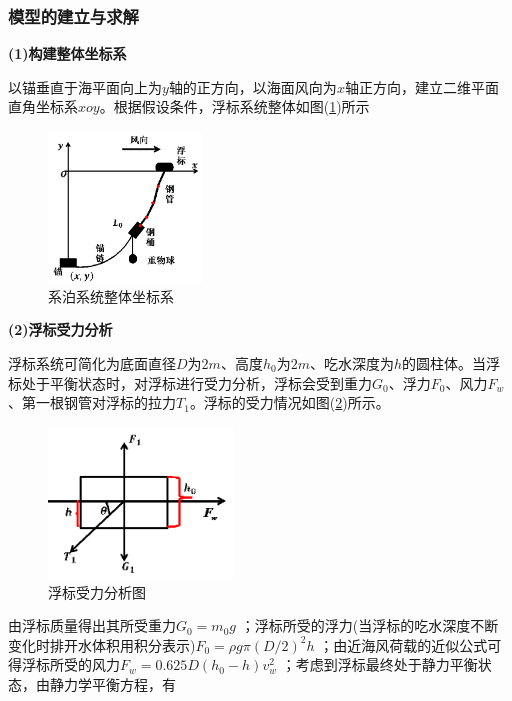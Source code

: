         \subsubsection{模型的建立与求解}
            \par
            \textbf{(1)构建整体坐标系}
            \par
            以锚垂直于海平面向上为$y$轴的正方向，以海面风向为$x$轴正方向，建立二维平面直角坐标系$xoy$。根据假设条件，浮标系统整体如图(\ref{fig:系泊系统整体坐标系})所示
            \begin{figure}[H]
            \centering
            \includegraphics[height=4cm]{images/xiposystem_aixs.jpg}
            \caption{系泊系统整体坐标系}
            \label{fig:系泊系统整体坐标系}
            \end{figure}
            \par
            \textbf{(2)浮标受力分析}
            \par
            浮标系统可简化为底面直径$D$为$2m$、高度$h_0$为$2m$、吃水深度为$h$的圆柱体。当浮标处于平衡状态时，对浮标进行受力分析，浮标会受到重力$G_0$、浮力$F_0$、风力$F_w$、第一根钢管对浮标的拉力$T_1$。浮标的受力情况如图(\ref{fig:浮标受力分析图})所示。
            \begin{figure}[H]
            \centering
            \includegraphics[height=4cm]{images/pipe_force_analysis.jpg}
            \caption{浮标受力分析图}
            \label{fig:浮标受力分析图}
            \end{figure}
            \par
            由浮标质量得出其所受重力$G_0 = m_0g$ ；浮标所受的浮力(当浮标的吃水深度不断变化时排开水体积用积分表示)$F_0 = \rho g\pi (D/2)^2h$ ；由近海风荷载的近似公式可得浮标所受的风力$F_w = 0.625 D(h_0-h)v_w^2$ ；考虑到浮标最终处于静力平衡状态，由静力学平衡方程，有
